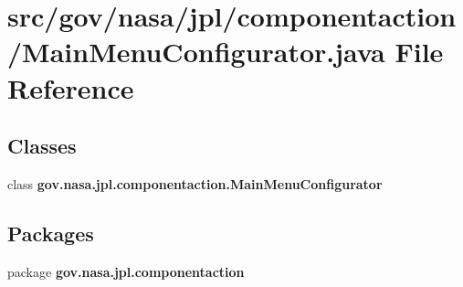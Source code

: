 \section{src/gov/nasa/jpl/componentaction/\+Main\+Menu\+Configurator.java File Reference}
\label{_main_menu_configurator_8java}
\subsection*{Classes}
\begin{DoxyCompactItemize}
\item 
class {\bf gov.\+nasa.\+jpl.\+componentaction.\+Main\+Menu\+Configurator}
\end{DoxyCompactItemize}
\subsection*{Packages}
\begin{DoxyCompactItemize}
\item 
package {\bf gov.\+nasa.\+jpl.\+componentaction}
\end{DoxyCompactItemize}
